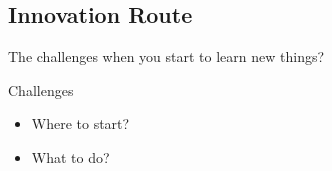 \documentclass[12pt]{beamer}
\begin{document}

%
\subsection{Innovation Route}
\begin{frame}{The challenges when you start to learn new things?}

\begin{block}{Challenges}

\begin{itemize}
\item<1-> Where to start?
\item<2-> What to do?
\end{itemize}
\end{block}
\end{frame}
\end{document}
